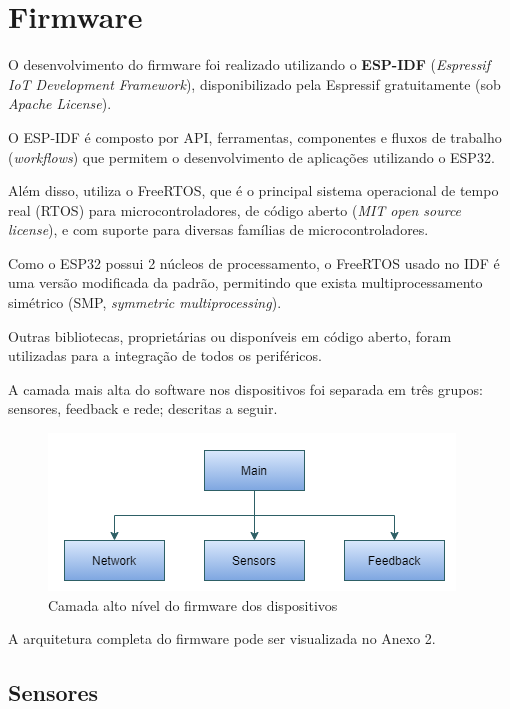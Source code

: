 \documentclass[../monografia.tex]{subfiles}
\begin{document}
\section{Firmware} \label{firmware}

O desenvolvimento do firmware foi realizado utilizando o \textbf{ESP-IDF} (\textit{Espressif IoT Development Framework}), disponibilizado pela Espressif\cite{esp-idf} gratuitamente (sob \textit{Apache License}). 

O ESP-IDF é composto por API, ferramentas, componentes e fluxos de trabalho (\textit{workflows}) que permitem o desenvolvimento de aplicações utilizando o ESP32. 

Além disso, utiliza o FreeRTOS, que é o principal sistema operacional de tempo real (RTOS) para microcontroladores\cite{freertos}, de código aberto (\textit{MIT open source license}), e com suporte para diversas famílias de microcontroladores.

Como o ESP32 possui 2 núcleos de processamento, o FreeRTOS usado no IDF é uma versão modificada da padrão, permitindo que exista multiprocessamento simétrico (SMP, \textit{symmetric multiprocessing}).

Outras bibliotecas, proprietárias ou disponíveis em código aberto, foram utilizadas para a integração de todos os periféricos. 

A camada mais alta do software nos dispositivos foi separada em três grupos: sensores, feedback e rede; descritas a seguir. %

\begin{figure}[h!]
	\centering
	\includegraphics[scale=0.8]{fw-arch-1}
	\caption{Camada alto nível do firmware dos dispositivos}
	\label{fig:fw-arch}
\end{figure}

A arquitetura completa do firmware pode ser visualizada no Anexo 2. %

\subsection{Sensores} %
\end{document}
